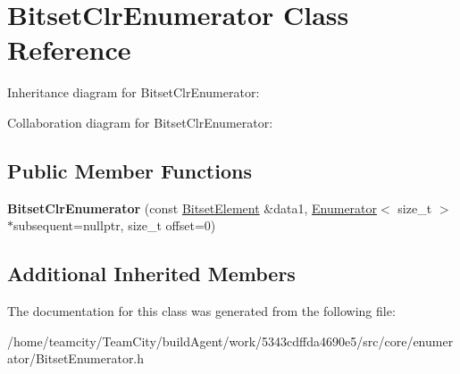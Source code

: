 \hypertarget{classBitsetClrEnumerator}{}\section{Bitset\+Clr\+Enumerator Class Reference}
\label{classBitsetClrEnumerator}


Inheritance diagram for Bitset\+Clr\+Enumerator\+:


Collaboration diagram for Bitset\+Clr\+Enumerator\+:
\subsection*{Public Member Functions}
\begin{DoxyCompactItemize}
\item 
{\bfseries Bitset\+Clr\+Enumerator} (const \hyperlink{classBitsetElement}{Bitset\+Element} \&data1, \hyperlink{classEnumerator}{Enumerator}$<$ size\+\_\+t $>$ $\ast$subsequent=nullptr, size\+\_\+t offset=0)\hypertarget{classBitsetClrEnumerator_ac7b5a979fa9212e62c033848a81ddc7c}{}\label{classBitsetClrEnumerator_ac7b5a979fa9212e62c033848a81ddc7c}

\end{DoxyCompactItemize}
\subsection*{Additional Inherited Members}


The documentation for this class was generated from the following file\+:\begin{DoxyCompactItemize}
\item 
/home/teamcity/\+Team\+City/build\+Agent/work/5343cdffda4690e5/src/core/enumerator/Bitset\+Enumerator.\+h\end{DoxyCompactItemize}
